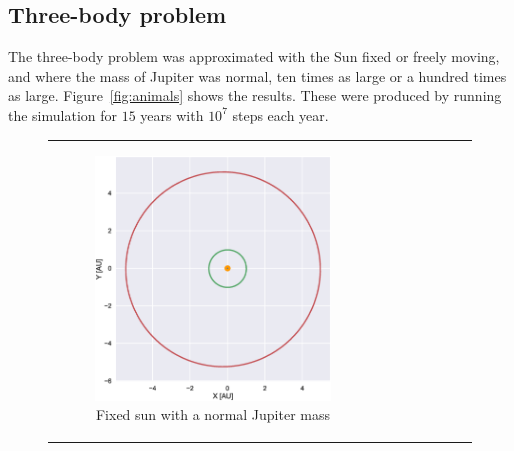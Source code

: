 \documentclass[aps,reprint]{revtex4-1}
\begin{document}
\subsection{Three-body problem}

The three-body problem was approximated with the Sun fixed or freely moving, and
where the mass of Jupiter was normal, ten times as large or a hundred times as
large. Figure~\ref{fig:animals} shows the results. These were produced by running
the simulation for \(15\) years with \(10^{7}\) steps each year.
\begin{figure}
  \begin{tabular}{cc}
    \centering
    \begin{subfigure}[b]{0.5\columnwidth}
        \includegraphics[width=\columnwidth]{figures/jupiter_1.eps}
        \caption{Fixed sun with a normal Jupiter mass}
        \label{fix1}
    \end{subfigure}&
    \begin{subfigure}[b]{0.5\columnwidth}

\end{subfigure}
\end{tabular}
\end{figure}
\end{document}
